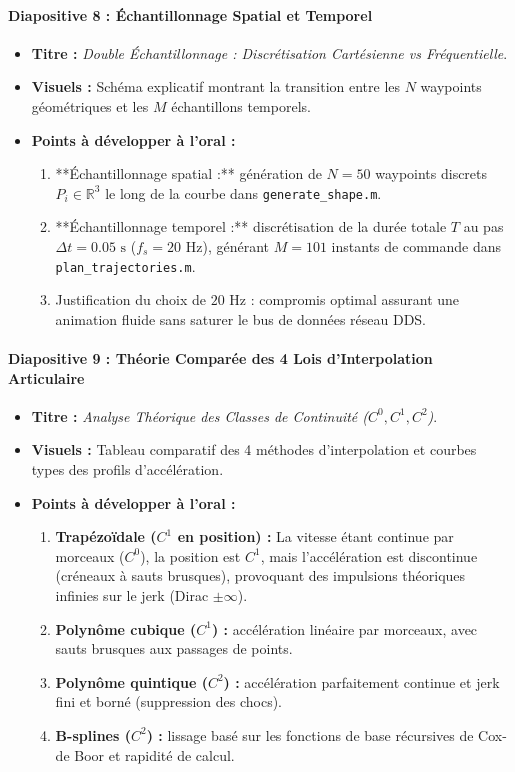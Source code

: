 \documentclass[11pt,a4paper]{report}
\begin{document}
\paragraph{Diapositive 8 : Échantillonnage Spatial et Temporel}
\begin{itemize}
    \item \textbf{Titre :} \textit{Double Échantillonnage : Discrétisation Cartésienne vs Fréquentielle}.
    \item \textbf{Visuels :} Schéma explicatif montrant la transition entre les $N$ waypoints géométriques et les $M$ échantillons temporels.
    \item \textbf{Points à développer à l'oral :}
    \begin{enumerate}
        \item **Échantillonnage spatial :** génération de $N=50$ waypoints discrets $P_i \in \mathbb{R}^3$ le long de la courbe dans \texttt{generate\_shape.m}.
        \item **Échantillonnage temporel :** discrétisation de la durée totale $T$ au pas $\Delta t = 0.05\text{ s}$ ($f_s = 20\text{ Hz}$), générant $M = 101$ instants de commande dans \texttt{plan\_trajectories.m}.
        \item Justification du choix de $20\text{ Hz}$ : compromis optimal assurant une animation fluide sans saturer le bus de données réseau DDS.
    \end{enumerate}
\end{itemize}

\paragraph{Diapositive 9 : Théorie Comparée des 4 Lois d'Interpolation Articulaire}
\begin{itemize}
    \item \textbf{Titre :} \textit{Analyse Théorique des Classes de Continuité ($C^0, C^1, C^2$)}.
    \item \textbf{Visuels :} Tableau comparatif des 4 méthodes d'interpolation et courbes types des profils d'accélération.
    \item \textbf{Points à développer à l'oral :}
    \begin{enumerate}
        \item \textbf{Trapézoïdale ($C^1$ en position) :} La vitesse étant continue par morceaux ($C^0$), la position est $C^1$, mais l'accélération est discontinue (créneaux à sauts brusques), provoquant des impulsions théoriques infinies sur le jerk (Dirac $\pm\infty$).
        \item \textbf{Polynôme cubique ($C^1$) :} accélération linéaire par morceaux, avec sauts brusques aux passages de points.
        \item \textbf{Polynôme quintique ($C^2$) :} accélération parfaitement continue et jerk fini et borné (suppression des chocs).
        \item \textbf{B-splines ($C^2$) :} lissage basé sur les fonctions de base récursives de Cox-de Boor et rapidité de calcul.
    \end{enumerate}
\end{itemize}
\end{document}
